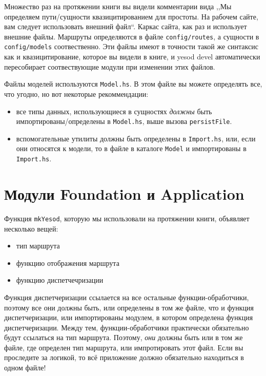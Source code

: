 Множество раз на протяжении книги вы видели комментарии вида ,,Мы определяем пути/сущности
квазицитированием для простоты. На рабочем сайте, вам следует использовать внешний файл``.
Каркас сайта, как раз и использует внешние файлы.
Маршруты определяются в файле \lstinline!config/routes!, а сущности в \lstinline!config/models!
соотвественно. Эти файлы имеют в точности такой же синтаксис как и квазицитирование, которое вы
видели в книге, и yesod devel автоматически пересобирает соотвествующие модули при изменении этих файлов.

Файлы моделей используются \lstinline!Model.hs!. В этом файле вы можете определять все, что угодно, но
вот некоторые рекоммендации:
\begin{itemize}
    \item все типы данных, использующиеся в сущностях \emph{должны} быть импортированы/определены
      в \lstinline!Model.hs!, выше вызова \lstinline!persistFile!.
    \item вспомогательные утилиты должны быть определены в \lstinline!Import.hs!, или, если они
      относятся к модели, то в файле в каталоге \lstinline!Model! и импортированы в \lstinline!Import.hs!.
\end{itemize}

\section{Модули Foundation и Application}

Функция \lstinline!mkYesod!, которую мы использовали на протяжении книги, объявляет несколько вещей:

\begin{itemize}
  \item тип маршрута
  \item функцию отображения маршрута
  \item функцию диспетчечризации
\end{itemize}

Функция диспетчеризации ссылается на все остальные функции-обработчики, поэтому все они должны быть, 
или определены в том же файле, что и функция диспетчеризации, или импортированы модулем,
в котором определена функция диспетчеризации.
Между тем, функции-обработчики практически обязательно будут ссылаться на тип маршрута. Поэтому,
\emph{они} должны быть или в том же файле, где определен тип маршрута, или импротировать этот файл.
Если вы проследите за логикой, то всё приложение должно обязательно находиться в одном файле!

